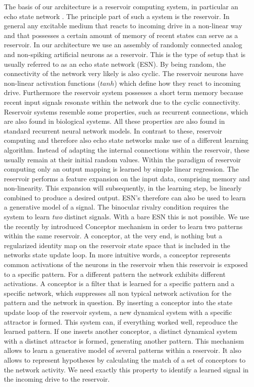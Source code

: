 \documentclass{frontiersSCNS} %
\begin{document}
The basis of our architecture is a reservoir computing system, in particular an echo state network \cite{Jaeger2001}. The principle part of such a system is the reservoir. In general any excitable medium that reacts to incoming drive in a non-linear way and that possesses a certain amount of memory of recent states can serve as a reservoir. In our architecture we use an assembly of randomly connected analog and non-spiking artificial neurons as a reservoir. This is the type of setup that is usually referred to as an echo state network (ESN).  By being random, the connectivity of the network very likely is also cyclic. The reservoir neurons have non-linear activation functions ($tanh$) which define how they react to incoming drive. Furthermore the reservoir system possesses a short term memory because recent input signals resonate within the network due to the cyclic connectivity. Reservoir systems resemble some  properties, such as recurrent connections, which are also found in biological systems. All these properties are also found in standard recurrent neural network models. In contrast to these, reservoir computing and therefore also echo state networks make use of a different learning algorithm. Instead of adapting the internal connections within the reservoir, these usually remain at their initial random values. Within the paradigm of reservoir computing only an output mapping is learned by simple linear regression. The reservoir performs a feature expansion on the input data, comprising memory and non-linearity. This expansion will subsequently, in the learning step, be linearly combined to produce a desired output. ESN's therefore can also be used to learn a generative model of a signal. The binocular rivalry condition requires the system to learn \textit{two} distinct signals. With a bare ESN this is not possible. We use the recently by  \cite{Jaeger2014} introduced Conceptor mechanism in order to learn two patterns within the same reservoir. A conceptor, at the very end, is nothing but a regularized identity map on the reservoir state space that is included in the networks state update loop. In more intuitive words, a conceptor represents common activations of the neurons in the reservoir when this reservoir is exposed to a specific pattern. For a different pattern the network exhibits different activations. A conceptor is a filter that is learned for a specific pattern and a specific network, which suppresses all non typical network activation for the pattern and the network in question. By inserting a conceptor into the state update loop of the reservoir system, a new dynamical system with a specific attractor is formed. This system can, if everything worked well, reproduce the learned pattern. If one inserts another conceptor, a distinct dynamical system with a distinct attractor is formed, generating another pattern. This mechanism allows to learn a generative model of several patterns within a reservoir. It also allows to represent hypotheses by calculating the match of a set of conceptors to the network activity. We need exactly this property to identify a learned signal in the incoming drive to the reservoir. 
    
\end{document}
